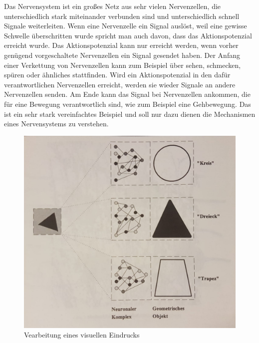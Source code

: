 Das Nervensystem ist ein großes Netz aus sehr vielen Nervenzellen, die unterschiedlich stark miteinander verbunden sind und unterschiedlich schnell Signale weiterleiten. Wenn eine Nervenzelle ein Signal auslöst, weil eine gewisse Schwelle überschritten wurde spricht man auch davon, dass das Aktionspotenzial erreicht wurde. Das Aktionspotenzial kann nur erreicht werden, wenn vorher genügend vorgeschaltete Nervenzellen ein Signal gesendet haben. Der Anfang einer Verkettung von Nervenzellen kann zum Beispiel über sehen, schmecken, spüren oder ähnliches stattfinden. Wird ein Aktionspotenzial in den dafür verantwortlichen Nervenzellen erreicht, werden sie wieder Signale an andere Nervenzellen senden. Am Ende kann das Signal bei Nervenzellen ankommen, die für eine Bewegung verantwortlich sind, wie zum Beispiel eine Gehbewegung. Das ist ein sehr stark vereinfachtes Beispiel und soll nur dazu dienen die Mechanismen eines Nervensystems zu verstehen.

\begin{figure}[hbt]
	\centering
	\includegraphics[width=0.9\linewidth]{./Bilder/VerarbeitungVisuellerEindruck-Kratzer}
	\caption{Vearbeitung eines visuellen Eindrucks \cite[S. 9]{Kratzer1991}}
	\label{fig:visuelleVerarbeitung}
\end{figure}

